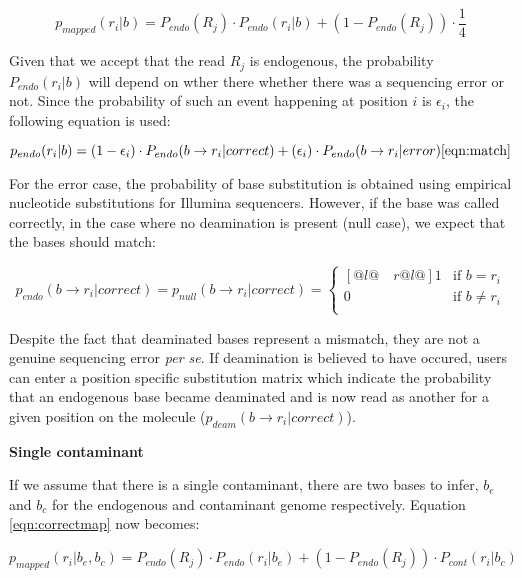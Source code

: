 \documentclass[a4paper,12pt]{article}
\begin{document}
\begin{equation}
p_{mapped}(r_i|b) =  P_{endo}(R_j) \cdot P_{endo} (r_i|b)   + (1-P_{endo}(R_j)) \cdot \frac {1} {4}
\label{eqn:correctmap}
\end{equation}

\noindent Given that we accept that the read $R_j$ is endogenous, the probability $P_{endo} (r_i|b)$ will depend on wther there whether there was a sequencing error or not. Since the probability of such an event happening at position $i$ is $\epsilon_i$, the following equation is used:

\begin{equation}
  p_{endo}(r_i|b)   =  (1-\epsilon_i ) \cdot  P_{endo}( b \to r_i|correct) +  (\epsilon_i) \cdot P_{endo}(  b \to r_i |error)   
\ref{eqn:match}
\end{equation} 

\noindent For the error case, the probability of base substitution is obtained using empirical nucleotide substitutions for Illumina sequencers. However, if the base was called correctly, in the case where no deamination is present (null case), we expect that the bases should match:

\begin{equation}
p_{endo}(b \to r_i | correct) =   p_{null}(b \to r_i | correct)   = \begin{cases}[@{}l@{\quad}r@{}l@{}]
    1  &  \text{if }  b = r_i    \\
    0 &  \text{if }  b \ne r_i    \\
  \end{cases}
\label{eqn:nullmatch}
\end{equation} 

\noindent Despite the fact that deaminated bases represent a mismatch, they are not a genuine sequencing error {\it per se}. If deamination is believed to have occured, users can enter a position specific substitution matrix which indicate the probability that an endogenous base became deaminated and is now read as another for a given position on the molecule ($p_{deam}(b \to r_i | correct)$). 

{\bf Single contaminant}

If we assume that there is a single contaminant, there are two bases to infer, $b_e$ and $b_c$ for the endogenous and contaminant genome respectively. Equation \ref{eqn:correctmap} now becomes:

\begin{equation}
p_{mapped}(r_i|b_e,b_c) =  P_{endo}(R_j) \cdot P_{endo} (r_i|b_e)   + (1-P_{endo}(R_j)) \cdot P_{cont} (r_i|b_c)
\end{equation}
\end{document}
